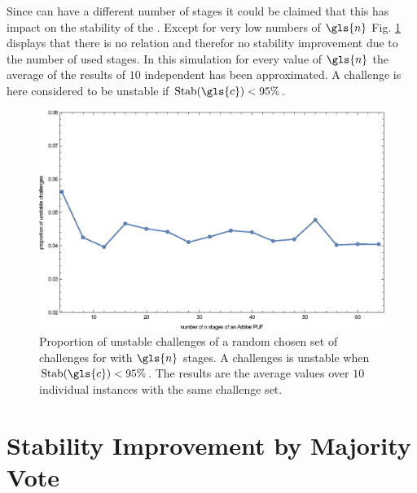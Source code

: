 Since \apufs can have a different number of stages it could be claimed that this has impact on the stability of the \puf.
Except for very low numbers of $\gls{n}$ Fig. \ref{fig:arbiterstabilities} displays that there is no relation and therefor no stability improvement due to the number of used stages. %
In this simulation for every value of $\gls{n}$ the average of the results of $10$ independent \apufs has been approximated.
A challenge is here considered to be unstable if $\Stab(\gls{c}) < 95 \%$.

\begin{figure}[ht]
\includegraphics[width=1.00\textwidth]{images/stages-stab-simulation.eps}
\caption[Proportion of unstable challenges of an \apuf]{Proportion of unstable challenges of a random chosen set of challenges for \apufs with $\gls{n}$ stages. 
A challenges is unstable when $\Stab(\gls{c}) < 95 \%$. 
The results are the average values over $10$ individual \puf instances with the same challenge set.} 
\label{fig:arbiterstabilities}
\end{figure}


\section{Stability Improvement by Majority Vote}
\label{sec:stabilityimprovementbymajorityvote}

